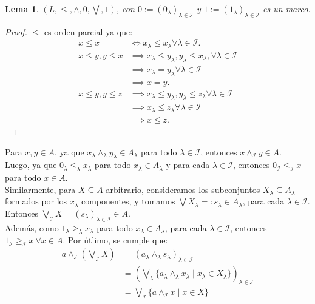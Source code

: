 \documentclass[12pt,letterpaper,titlepage]{article}
\newtheorem*{lemma}{Lema}
\theoremstyle{definition}
\newcommand\scr[1]{\mathscr{#1}}
\newcommand\<{\langle}
\renewcommand\>{\rangle}
\begin{document}
\begin{lemma}
    $(L,\leq,\wedge, 0, \bigvee, 1)$, con
    $0:=(0_\lambda)_{\lambda\in\scr{I}}$ y
    $1:=(1_\lambda)_{\lambda\in\scr{I}}$ es un marco.
\end{lemma}
\begin{proof}
    $\leq$ es orden parcial ya que:
    \begin{align*}
        x \leq x
            & \iff x_\lambda \leq x_\lambda \forall \lambda\in\scr I. \\
        x \leq y, y \leq x
            &\implies x_\lambda \leq y_\lambda,
            y_\lambda \leq x_\lambda, \forall  \lambda\in\scr{I}\\
            &\implies x_\lambda = y_\lambda
            \forall\lambda\in\scr{I}\\
            &\implies x = y.\\
        x \leq y, y \leq z
            &\implies x_\lambda \leq y_\lambda,
            y_\lambda \leq z_\lambda
            \forall\lambda\in\scr{I}\\
            &\implies x_\lambda  \leq z_\lambda
            \forall  \lambda\in\scr{I}\\
            &\implies x \leq z.
    \end{align*}
\end{proof}
Para $x,y\in A$, ya que $x_\lambda\wedge_\lambda y_\lambda\in A_\lambda$ para todo $\lambda\in\mathscr{I}$, entonces $x\wedge_\mathscr{I}y\in A$.\\
Luego, ya que $0_\lambda\leq_\lambda x_\lambda$ para todo $x_\lambda\in A_\lambda$ y para cada $\lambda\in\mathscr{I}$, entonces $0_\mathscr{I}\leq_\mathscr{I}x$ para todo $x\in A$.\\
Similarmente, para $X\subseteq A$ arbitrario, consideramos los subconjuntos $X_\lambda\subseteq A_\lambda$ formados por los $x_\lambda$ componentes, y tomamos $\bigvee X_\lambda=:s_\lambda\in A_\lambda$,  para cada $\lambda\in\mathscr{I}$.\\
Entonces $\bigvee_\mathscr{I}X=(s_\lambda)_{\lambda\in\mathscr{I}}\in A$.\\
Además, como $1_\lambda\geq_\lambda x_\lambda$ para todo $x_\lambda\in A_\lambda$, para cada $\lambda\in\mathscr{I}$, entonces $1_\mathscr{I}\geq_\mathscr{I} x\ \forall x\in A$.
Por útlimo, se cumple que:
\begin{align*}
    a\wedge_\mathscr{I}\left(\bigvee_\mathscr{I} X\right) & = (a_\lambda\wedge_\lambda s_\lambda)_{\lambda\in\mathscr{I}}\\
    & = \left(\bigvee_\lambda\{a_\lambda\wedge_\lambda x_\lambda\mid x_\lambda\in X_\lambda\}\right)_{\lambda\in\mathscr{I}}\\
    & = \bigvee_\mathscr{I} \{a\wedge_\mathscr{I}x\mid x\in X\}
\end{align*}
\end{document}
